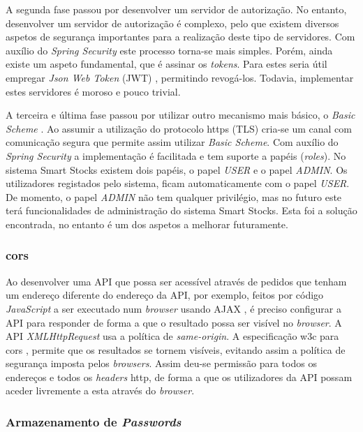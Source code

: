 A segunda fase passou por desenvolver um servidor de autorização. No entanto, desenvolver um servidor de autorização é complexo, pelo que existem diversos aspetos de segurança importantes para a realização deste tipo de servidores. Com auxílio do \textit{Spring Security} este processo torna-se mais simples. Porém, ainda existe um aspeto fundamental, que é assinar os \textit{tokens}. Para estes seria útil empregar \textit{Json Web Token} (JWT) \cite{JSONWebT8:introduction}, permitindo revogá-los. Todavia, implementar estes servidores é moroso e pouco trivial. 

A terceira e última fase passou por utilizar outro mecanismo mais básico, o \textit{Basic Scheme} \cite{RFC7617:basicSheme}. Ao assumir a utilização do protocolo \acrfull{https} \cite{RFC2660:https} (TLS) \cite{RFC5246T88:tls} cria-se um canal com comunicação segura que permite assim utilizar \textit{Basic Scheme}. Com auxílio do \textit{Spring Security} a implementação é facilitada e tem suporte a papéis (\textit{roles}). No sistema Smart Stocks existem dois papéis, o papel \textit{USER} e o papel \textit{ADMIN}. Os utilizadores registados pelo sistema, ficam automaticamente com o papel \textit{USER}. De momento, o papel \textit{ADMIN} não tem qualquer privilégio, mas no futuro este terá funcionalidades de administração do sistema Smart Stocks. Esta foi a solução encontrada, no entanto é um dos aspetos a melhorar futuramente.

\subsubsection{\acrlong{cors}}

Ao desenvolver uma API que possa ser acessível através de pedidos que tenham um endereço diferente do endereço da API, por exemplo, feitos por código \textit{JavaScript} a ser executado num \textit{browser} usando AJAX \cite{Ajax:mozilla}, é preciso configurar a API para responder de forma a que o resultado possa ser visível no \textit{browser}. A API \textit{XMLHttpRequest} \cite{XMLHttp:online} usa a política de \textit{same-origin}. A especificação \acrfull{w3c} para \acrfull{cors} \cite{CrossOrigin:resource}, permite que os resultados se tornem visíveis, evitando assim a política de segurança imposta pelos \textit{browsers}. Assim deu-se permissão para todos os endereços e todos os \textit{headers} \acrshort{http}, de forma a que os utilizadores da API possam aceder livremente a esta através do \textit{browser}.

\subsubsection{Armazenamento de \textit{Passwords}}

